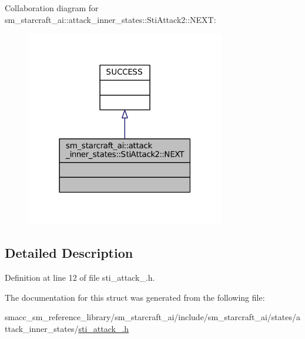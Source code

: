 Collaboration diagram for sm\+\_\+starcraft\+\_\+ai\+:\+:attack\+\_\+inner\+\_\+states\+:\+:Sti\+Attack2\+:\+:N\+E\+XT\+:
\nopagebreak
\begin{figure}[H]
\begin{center}
\leavevmode
\includegraphics[width=247pt]{structsm__starcraft__ai_1_1attack__inner__states_1_1StiAttack2_1_1NEXT__coll__graph}
\end{center}
\end{figure}


\subsection{Detailed Description}


Definition at line 12 of file sti\+\_\+attack\+\_.\+h.



The documentation for this struct was generated from the following file\+:\begin{DoxyCompactItemize}
\item 
smacc\+\_\+sm\+\_\+reference\+\_\+library/sm\+\_\+starcraft\+\_\+ai/include/sm\+\_\+starcraft\+\_\+ai/states/attack\+\_\+inner\+\_\+states/\hyperlink{sti__attack__2_8h}{sti\+\_\+attack\+\_.\+h}\end{DoxyCompactItemize}

